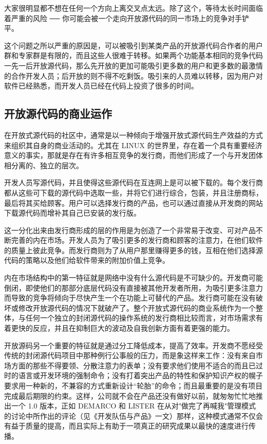 大家很明显都不想在任何一个方向上离交叉点太远。除了这个，等待太长时间面临着严重的风险 ── 你可能会被一个走向开放源代码的同一市场上的竞争对手铲平。


这个问题之所以严重的原因是，可以被吸引到某类产品的开放源代码合作者的用户群和专家群是有限的，而且这些人很难于转移。如果两个功能基本相同的竞争代码一先一后开放源代码，那么先开放的更加可能吸引更多数的用户和更多数的最激情的合作开发人员；后开放的则不得不吃剩饭。吸引来的人员难以转移，因为用户对软件已经熟悉，而开发人员已经在代码上投资了很多的时间。


\subsection{开放源代码的商业运作}
在开放式源代码的社区中，通常是以一种倾向于增强开放式源代码生产效益的方式来组织其自身的商业活动的。尤其在 LINUX 的世界里，存在着一个具有重要经济意义的事实，那就是存在有许多相互竞争的发行商，而他们形成了一个与开发团体相分离的、独立的层次。


开发人员写源代码，并且使得这些源代码在互连网上是可以被下载的。每个发行商都从这些可下载的源代码中选取一些，并将它们进行综合，包装，并且注册商标，最后将其买给顾客。用户可以选择发行商的产品，也可以通过直接从开发商的网站下载源代码而增补其自己已安装的发行版。


这一分化出来由发行商形成的层的作用是为创造了一个非常易于改变、可对产品不断完善的内在市场。开发人员为了吸引更多的发行商和顾客的注意力，在他们软件的质量上彼此竞争。而发行商则为了从用户那里赚得更多的钱，互相在他们选择源代码的策略以及他们给软件带来的附加价值上竞争。


内在市场结构中的第一特征就是网络中没有什么源代码是不可缺少的。开发商可能倒闭，即使他们的那部分底层代码没有直接被其他开发者所用，为吸引更多注意力而导致的竞争将倾向于尽快产生一个在功能上可替代的产品。发行商可能在没有破坏或修改开放源代码的情况下就破产了。整个开放式源代码的商业系统作为一个整体，与任何一个独立的封闭源代码的操作系统的发行商相比较而言，对市场需求有着更快的反应，并且在抑制巨大的波动及自我创新方面有着更强的能力。


开放源码另一个重要的特征就是通过分工降低成本，提高了效率。开发商不愿经受传统的封闭源代码项目中那种例行公事般的压力，而是象这样来工作：没有来自市场方面的那些不得要领、分散注意力的表单；没有要求他们使用不适合的而且已过时的语言或开发环境的强制命令；没有打着突出产品的特性和保护知识产权的幌子要求用一种新的，不兼容的方式重新设计“轮胎”的命令；而且最重要的是没有项目完成最后期限的约束。这样，公司就不会在产品还没有做好以前，就匆匆忙忙地推出一个 1.0 版本，正如 DEMARCO 和 LISTER 在从对"做完了再喊我"管理模式的讨论中所作出的评论（见《开发队伍与产品》一文）那样，这种模式通常不仅会有益于质量的提高，而且实际上有助于一项真正的研究成果以最快的速度进行传播。


